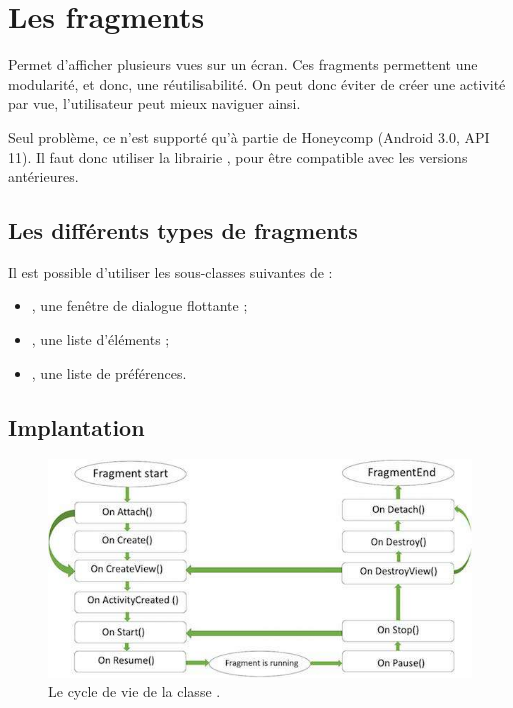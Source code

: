 \section{Les fragments}
Permet d'afficher plusieurs vues sur un écran. Ces fragments permettent une modularité, et donc, une réutilisabilité. On peut donc éviter de créer une activité par vue, l'utilisateur peut mieux naviguer ainsi.

Seul problème, ce n'est supporté qu'à partie de Honeycomp (Android 3.0, API 11). Il faut donc utiliser la librairie , pour être compatible avec les versions antérieures.

\subsection{Les différents types de fragments}
Il est possible d'utiliser les sous-classes suivantes de  :
\begin{itemize}
    \item {}, une fenêtre de dialogue flottante ;
    \item {}, une liste d’éléments ;
    \item {}, une liste de préférences.
\end{itemize}

\subsection{Implantation}
\begin{figure}[H]
    \centering
    \includegraphics[width=.75\textwidth]{assets/fragment.jpg}
    \caption{Le cycle de vie de la classe .}
\end{figure}

